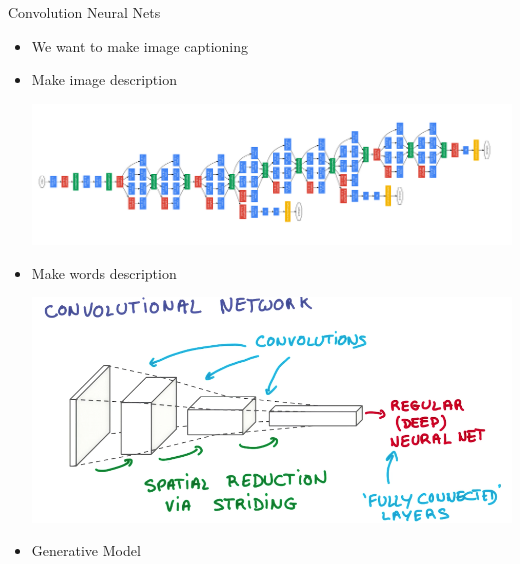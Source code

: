 \documentclass{beamer}
\begin{document}
\begin{frame}{Convolution Neural Nets}
	\begin{itemize}
		  \item We want to make image captioning
		  \item Make image description
		
		\begin{center}
			  \includegraphics[scale=0.25]{img/gn}
		\end{center}
		
		  \item Make words description 
		\begin{center}
			  \includegraphics[scale=0.15]{img/cnn}
		\end{center}
		  \item Generative Model
	\end{itemize}
\end{frame}
\end{document}
